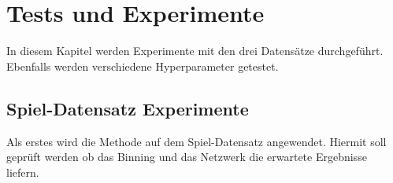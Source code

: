 \chapter{Tests und Experimente}
In diesem Kapitel werden Experimente mit den drei Datensätze durchgeführt. Ebenfalls werden verschiedene Hyperparameter getestet.

\section{Spiel-Datensatz Experimente}
Als erstes wird die Methode auf dem Spiel-Datensatz angewendet. Hiermit soll geprüft werden ob das Binning und das Netzwerk die erwartete
Ergebnisse liefern. 